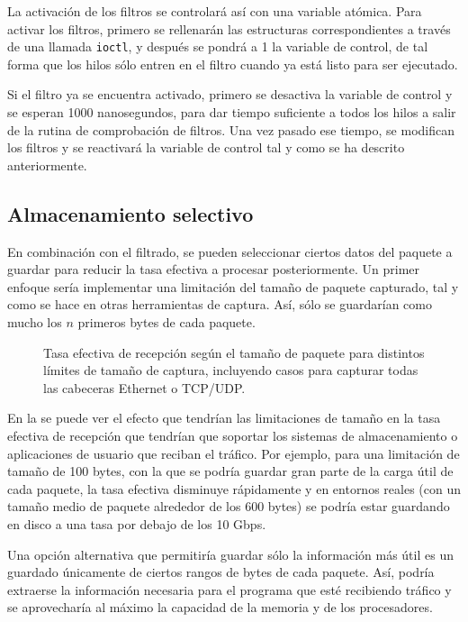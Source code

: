 \documentclass[oneside, draft]{epstfg}
\begin{document}
La activación de los filtros se controlará así con una variable atómica. Para activar los filtros, primero se rellenarán las estructuras correspondientes a través de una llamada \texttt{ioctl}, y después se pondrá a 1 la variable de control, de tal forma que los hilos sólo entren en el filtro cuando ya está listo para ser ejecutado.

Si el filtro ya se encuentra activado, primero se desactiva la variable de control y se esperan 1000 nanosegundos, para dar tiempo suficiente a todos los hilos a salir de la rutina de comprobación de filtros. Una vez pasado ese tiempo, se modifican los filtros y se reactivará la variable de control tal y como se ha descrito anteriormente.

\subsection{Almacenamiento selectivo}

En combinación con el filtrado, se pueden seleccionar ciertos datos del paquete a guardar para reducir la tasa efectiva a procesar posteriormente. Un primer enfoque sería implementar una limitación del tamaño de paquete capturado, tal y como se hace en otras herramientas de captura. Así, sólo se guardarían como mucho los $n$ primeros bytes de cada paquete.

\begin{figure}[btp]
\caption[Tasa efectiva limitando el tamaño de paquete]{Tasa efectiva de recepción según el tamaño de paquete para distintos límites de tamaño de captura, incluyendo casos para capturar todas las cabeceras Ethernet o TCP/UDP.}
\label{fig:Desarrollo:CaplenEffects}
\end{figure}

En la  se puede ver el efecto que tendrían las limitaciones de tamaño en la tasa efectiva de recepción que tendrían que soportar los sistemas de almacenamiento o aplicaciones de usuario que reciban el tráfico. Por ejemplo, para una limitación de tamaño de 100 bytes, con la que se podría guardar gran parte de la carga útil de cada paquete, la tasa efectiva disminuye rápidamente y en entornos reales (con un tamaño medio de paquete alrededor de los 600 bytes) se podría estar guardando en disco a una tasa por debajo de los 10 Gbps.

Una opción alternativa que permitiría guardar sólo la información más útil es un guardado únicamente de ciertos rangos de bytes de cada paquete. Así, podría extraerse la información necesaria para el programa que esté recibiendo tráfico y se aprovecharía al máximo la capacidad de la memoria y de los procesadores.
\end{document}
